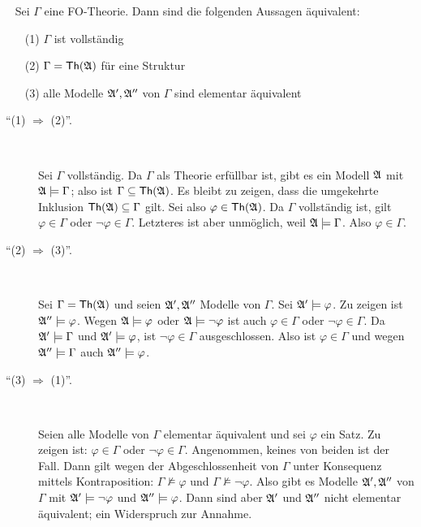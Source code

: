 \documentclass[fontsize=11pt, twoside=false, numbers=autoenddot]{scrbook}
\begin{document}
\par\medskip\noindent
{}~
Sei $\Gamma$ eine FO-Theorie. Dann sind die folgenden Aussagen \"aquivalent:
\begin{enumerate}
  \item[(1)]
    $\Gamma$ ist vollst\"andig
  \item[(2)]
    $\Gamma=\textsf{Th}(\mathfrak{A})$ f\"ur eine Struktur \Amf
  \item[(3)]
    alle Modelle $\mathfrak{A}',\mathfrak{A}''$ von $\Gamma$ sind elementar \"aquivalent
\end{enumerate}
%
\begin{beweis}
  \begin{description}
    \item[{\boldmath "`(1) $\Rightarrow$ (2)"'.}]
      ~\par\smallskip
      Sei $\Gamma$ vollständig.
      Da $\Gamma$ als Theorie erfüllbar ist, gibt es ein Modell $\mathfrak{A}$ mit $\mathfrak{A} \models \Gamma$;
      also ist $\Gamma \subseteq \textsf{Th}(\mathfrak{A})$.
      Es bleibt zu zeigen, dass die umgekehrte Inklusion $\textsf{Th}(\mathfrak{A}) \subseteq \Gamma$ gilt.
      Sei also $\varphi \in \textsf{Th}(\mathfrak{A})$.
      Da $\Gamma$ vollständig ist, gilt $\varphi \in \Gamma$ oder $\lnot\varphi \in \Gamma$.
      Letzteres ist aber unmöglich, weil $\mathfrak{A} \models \Gamma$. Also $\varphi \in \Gamma$.
      \par\smallskip
    \item[{\boldmath "`(2) $\Rightarrow$ (3)"'.}]
      ~\par\smallskip
      Sei $\Gamma=\textsf{Th}(\mathfrak{A})$
      und seien $\mathfrak{A}',\mathfrak{A}''$ Modelle von $\Gamma$.
      Sei $\mathfrak{A}' \models \varphi$. Zu zeigen ist $\mathfrak{A}'' \models \varphi$.
      Wegen $\mathfrak{A} \models \varphi$ oder $\mathfrak{A} \models \lnot\varphi$
      ist auch $\varphi \in \Gamma$ oder $\lnot\varphi \in \Gamma$.
      Da $\mathfrak{A}' \models \Gamma$ und $\mathfrak{A}' \models \varphi$,
      ist $\neg\varphi \in \Gamma$ ausgeschlossen.
      Also ist $\varphi \in \Gamma$ und wegen $\mathfrak{A}'' \models \Gamma$ auch $\mathfrak{A}'' \models \varphi$.
      \par\smallskip
    \item[{\boldmath "`(3) $\Rightarrow$ (1)"'.}]
      ~\par\smallskip
      Seien alle Modelle von $\Gamma$ elementar äquivalent
      und sei $\varphi$ ein Satz.
      Zu zeigen ist: $\varphi \in \Gamma$ oder $\lnot\varphi \in \Gamma$.
      Angenommen, keines von beiden ist der Fall.
      Dann gilt wegen der Abgeschlossenheit von $\Gamma$ unter Konsequenz mittels Kontraposition:
      $\Gamma \not\models \varphi$ und $\Gamma \not\models \lnot\varphi$.
      Also gibt es Modelle $\mathfrak{A}',\mathfrak{A}''$ von $\Gamma$ mit $\mathfrak{A}' \models \lnot\varphi$
      und $\mathfrak{A}'' \models \varphi$.
      Dann sind aber $\mathfrak{A}'$ und $\mathfrak{A}''$ nicht elementar äquivalent;
      ein Widerspruch zur Annahme.
      \qedhere
  \end{description}

\end{beweis}%
\end{document}
